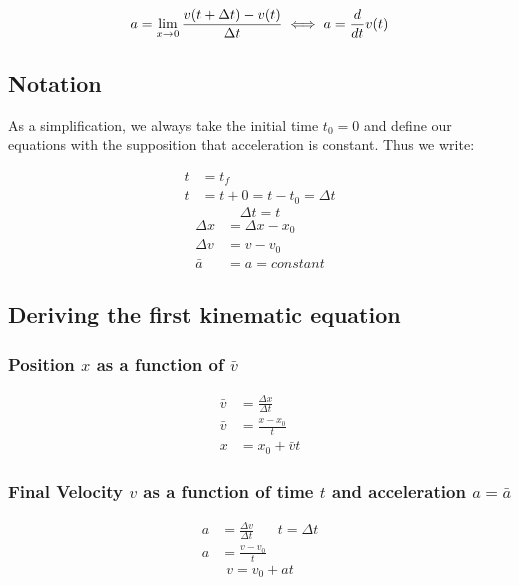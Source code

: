 \documentclass{article}
\numberwithin{equation}{section}
\begin{document}
 \begin{equation}\label{eq:defnacc}
    a = \lim_{x\to0}\frac{v(t + \Delta t) - v(t) }{\Delta t} 
    \iff a = \frac{d}{dt}v(t) \\
  \end{equation}
\newpage
 \subsection{Notation}
 As a simplification, we always take the initial time $t_{0}=0$ and define our
 equations with the supposition that acceleration is constant. Thus we write:
 
\[
  \begin{aligned}
    t &= t_f \\
    t &= t + 0 = t - t_{0} = \Delta t
  \end{aligned}
\]
 \begin{equation}
   \boxed{    \Delta t = t \label{time}}
 \end{equation}
\[
  \begin{aligned}
    \Delta x &= \Delta x - x_{0} \\
    \Delta v &= v - v_{0} \\
    \bar{a} &= a = constant
  \end{aligned}
\]
 \subsection{Deriving the first kinematic equation}
 
 \subsubsection{Position $x$ as a function of $\bar{v}$}
\[
  \begin{aligned}
    \bar{v} &= \frac{\Delta x}{\Delta t} \\
    \bar{v} &= \frac{x-x_{0}}{t} \\ 
    x &= x_{0}+\bar{v}t
  \end{aligned}
\]
\subsubsection{Final Velocity $v$ as a function of time $t$ and acceleration
$a=\bar{a}$}
 
\[
  \begin{aligned}
    a &= \frac{\Delta v}{\Delta t} & t = \Delta t \\
    a  &= \frac{v-v_{0}}{t}
  \end{aligned}
\]
 \begin{equation}
   v = v_{0} + at
 \end{equation}
\end{document}
